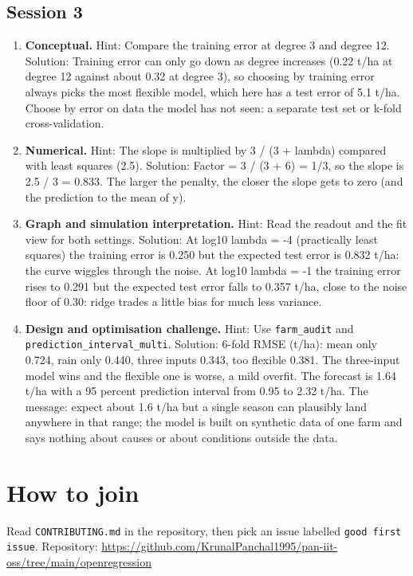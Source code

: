 \documentclass[11pt,a4paper]{article}
\begin{document}
\subsection*{Session 3}
\begin{enumerate}[nosep]
\item \textbf{Conceptual.} Hint: Compare the training error at degree 3 and degree 12. Solution: Training error can only go down as degree increases (0.22 t/ha at degree 12 against about 0.32 at degree 3), so choosing by training error always picks the most flexible model, which here has a test error of 5.1 t/ha. Choose by error on data the model has not seen: a separate test set or k-fold cross-validation.
\item \textbf{Numerical.} Hint: The slope is multiplied by 3 / (3 + lambda) compared with least squares (2.5). Solution: Factor = 3 / (3 + 6) = 1/3, so the slope is 2.5 / 3 = 0.833. The larger the penalty, the closer the slope gets to zero (and the prediction to the mean of y).
\item \textbf{Graph and simulation interpretation.} Hint: Read the readout and the fit view for both settings. Solution: At log10 lambda = -4 (practically least squares) the training error is 0.250 but the expected test error is 0.832 t/ha: the curve wiggles through the noise. At log10 lambda = -1 the training error rises to 0.291 but the expected test error falls to 0.357 t/ha, close to the noise floor of 0.30: ridge trades a little bias for much less variance.
\item \textbf{Design and optimisation challenge.} Hint: Use \texttt{farm\_audit} and \texttt{prediction\_interval\_multi}. Solution: 6-fold RMSE (t/ha): mean only 0.724, rain only 0.440, three inputs 0.343, too flexible 0.381. The three-input model wins and the flexible one is worse, a mild overfit. The forecast is 1.64 t/ha with a 95 percent prediction interval from 0.95 to 2.32 t/ha. The message: expect about 1.6 t/ha but a single season can plausibly land anywhere in that range; the model is built on synthetic data of one farm and says nothing about causes or about conditions outside the data.
\end{enumerate}

\section{How to join}
Read \texttt{CONTRIBUTING.md} in the repository, then pick an issue labelled \texttt{good first issue}. Repository: \url{https://github.com/KrunalPanchal1995/pan-iit-oss/tree/main/openregression}
\end{document}
